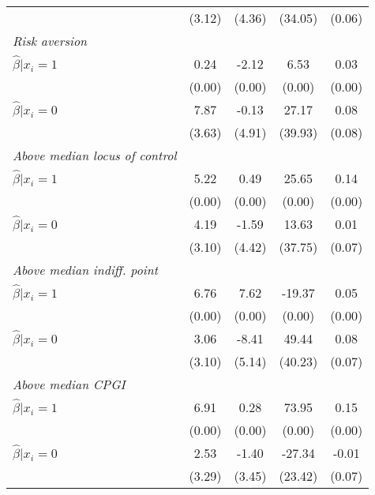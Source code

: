 \begin{table}[h]
{\begin{threeparttable}
\begin{tabular}{l*{4}{c}}
                &   (3.12)&   (4.36)&  (34.05)&   (0.06)\\
\textit{Risk aversion}&         &         &         &         \\
\hspace{0.5cm} \(\hat\beta|x_i=1\)&     0.24&    -2.12&     6.53&     0.03\\
                &   (0.00)&   (0.00)&   (0.00)&   (0.00)\\
\hspace{0.5cm} \(\hat\beta|x_i=0\)&7.87\sym{**}&    -0.13&    27.17&     0.08\\
                &   (3.63)&   (4.91)&  (39.93)&   (0.08)\\
\textit{Above median locus of control}&         &         &         &         \\
\hspace{0.5cm} \(\hat\beta|x_i=1\)&     5.22&     0.49&    25.65&     0.14\\
                &   (0.00)&   (0.00)&   (0.00)&   (0.00)\\
\hspace{0.5cm} \(\hat\beta|x_i=0\)&     4.19&    -1.59&    13.63&     0.01\\
                &   (3.10)&   (4.42)&  (37.75)&   (0.07)\\
\textit{Above median indiff. point}&         &         &         &         \\
\hspace{0.5cm} \(\hat\beta|x_i=1\)&     6.76&     7.62&   -19.37&     0.05\\
                &   (0.00)&   (0.00)&   (0.00)&   (0.00)\\
\hspace{0.5cm} \(\hat\beta|x_i=0\)&     3.06&    -8.41&    49.44&     0.08\\
                &   (3.10)&   (5.14)&  (40.23)&   (0.07)\\
\textit{Above median CPGI}&         &         &         &         \\
\hspace{0.5cm} \(\hat\beta|x_i=1\)&6.91\sym{*}&     0.28&    73.95&0.15\sym{*}\\
                &   (0.00)&   (0.00)&   (0.00)&   (0.00)\\
\hspace{0.5cm} \(\hat\beta|x_i=0\)&     2.53&    -1.40&   -27.34&    -0.01\\
                &   (3.29)&   (3.45)&  (23.42)&   (0.07)\\

\end{tabular}
\end{threeparttable}}
\end{table}
